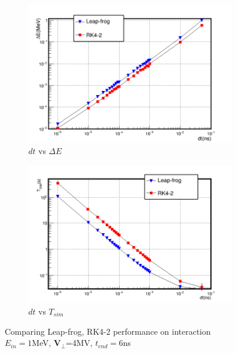 \documentclass[a4paper,oneside,12pt]{report}
\numberwithin{equation}{chapter}
\begin{document}
\begin{figure}[H]
    \captionsetup[subfigure]{justification=centering}
    \captionsetup{justification=centering}
    \centering
    \begin{subfigure}{0.9\textwidth}
        \centering
        \includegraphics[width=\linewidth]{./figures/analiz/90staticE_lf_rk2_dt-E_3.png}
        \caption*{$dt$ vs $\Delta E$}
    \end{subfigure}
    
    \begin{subfigure}{0.9\textwidth}
        \centering
        \includegraphics[width=\linewidth]{./figures/analiz/90staticE_lf_rk2_dt-Tsim.png}
        \caption*{$dt$ vs $T_{sim}$}
    \end{subfigure}
    \caption{Comparing Leap-frog, RK4-2 performance on \eE interaction\\ $E_{in}=1$MeV, $\textbf{V}_{\perp}$=4MV, $t_{end}=6$ns}
    \label{fig:lf_rk2_perp_stat_E_comparison}
\end{figure}
\end{document}
